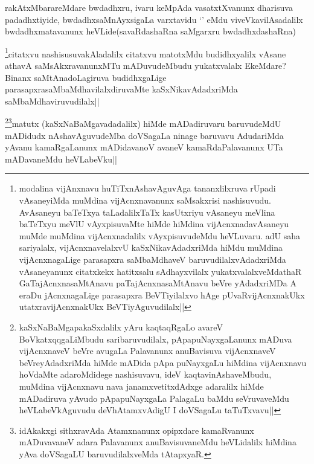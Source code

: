 \begin{artha}
rakAtxMbarareMdare bwdadhxru, ivaru keMpAda vasatxtXvanunx dharisuva padadhxtiyide, bwdadhxsaMnAyxsigaLa varxtavidu `\stext' eMdu viveVkavilAsadalilx bwdadhxmatavanunx heVLide(savaRdashaRna saMgarxru bwdadhxdashaRna)
\end{artha}


\begin{artha}
\footnote{modalina vijAnxnavu huTiTxnAshavAguvAga tananxlilxruva rUpadi vAsaneyiMda muMdina vijAcnxnavanunx saMsakxrisi nashisuvudu. AvAsaneyu baTeTxya taLadalilxTaTx kasUtxriyu vAsaneyu meVlina baTeTxyu meVlU vAyxpisuvaMte hiMde hiMdina vijAcnxnadavAsaneyu muMde muMdina vijAcnxnadalilx vAyxpisuvudeMdu heVLuvaru. adU saha sariyalalx, vijAcnxnavelalxvU kaSxNikavAdadxriMda hiMdu muMdina vijAcnxnagaLige parasapxra saMbaMdhaveV baruvudilalxvAdadxriMda vAsaneyanunx citatxkekx hatitxsalu sAdhayxvilalx yukatxvalalxveMdathaR GaTajAcnxnasaMtAnavu paTajAcnxnasaMtAnavu beVre yAdadxriMDa A eraDu jAcnxnagaLige parasapxra BeVTiyilalxvo hAge pUvaRvijAcnxnakUkx utatxravijAcnxnakUkx BeVTiyAguvudilalx||}citatxvu nashisusuvakAladalilx citatxvu matotxMdu budidhxyalilx vAsane athavA saMsAkxravanunxMTu mADuvudeMbudu yukatxvalalx EkeMdare? Binanx saMtAnadoLagiruva budidhxgaLige parasapxrasaMbaMdhavilalxdiruvaMte kaSxNikavAdadxriMda saMbaMdhaviruvudilalx||
\end{artha}

\begin{artha}
\footnote{kaSxNaBaMgapakaSxdalilx yAru kaqtaqRgaLo avareV BoVkatxqqgaLiMbudu saribaruvudilalx, pApapuNayxgaLanunx mADuva vijAcnxnaveV beVre avugaLa Palavanunx anuBavisuva vijAcnxnaveV beVreyAdadxriMda hiMde mADida pApa puNayxgaLu hiMdina vijAcnxnavu hoVdaMte adaroMdidege nashisuvavu, ideV kaqtavinAshaveMbudu, muMdina vijAcnxnavu nava janamxvetitxdAdxge adaralilx hiMde mADadiruva yAvudo pApapuNayxgaLa PalagaLu baMdu seVruvaveMdu heVLabeVkAguvudu deVhAtamxvAdigU I doVSagaLu taTuTxvavu||}\footnote{idAkakxgi sithxravAda Atamxnanunx opipxdare kamaRvanunx mADuvavaneV adara Palavanunx anuBavisuvaneMdu heVLidalilx hiMdina yAva doVSagaLU baruvudilalxveMda tAtapxyaR.}matutx (kaSxNaBaMgavadadalilx) hiMde mADadiruvaru baruvudeMdU mADidudx nAshavAguvudeMba doVSagaLa ninage baruvavu AdudariMda yAvanu kamaRgaLanunx mADidavanoV avaneV kamaRdaPalavanunx UTa mADavaneMdu heVLabeVku||
\end{artha}


